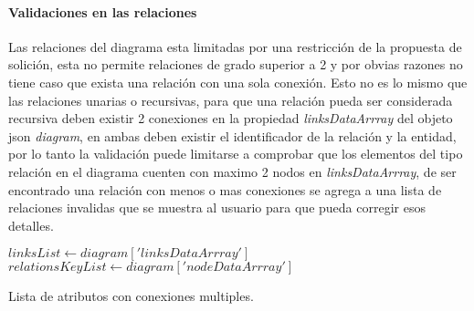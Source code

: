 \paragraph*{Validaciones en las relaciones}

Las relaciones del diagrama esta limitadas por una restricción de la propuesta de solición, esta no permite relaciones de grado superior a 2 y por obvias razones no tiene caso que exista una relación con una sola conexión. Esto no es lo mismo que las relaciones unarias o recursivas, para que una relación pueda ser considerada recursiva deben existir 2 conexiones en la propiedad \textit{linksDataArrray} del objeto json \textit{diagram}, en ambas deben existir el identificador de la relación y la entidad, por lo tanto la validación puede limitarse a comprobar que los elementos del tipo relación en el diagrama cuenten con maximo 2 nodos en \textit{linksDataArrray}, de ser encontrado una relación con menos o mas conexiones se agrega a una lista de relaciones invalidas que se muestra al usuario para que pueda corregir esos detalles.

\begin{algorithm}[H]

  $linksList \gets diagram['linksDataArrray']$\\
  $relationsKeyList \gets diagram['nodeDataArrray']$\\

  \caption{Lista de atributos con conexiones multiples.}
\end{algorithm}